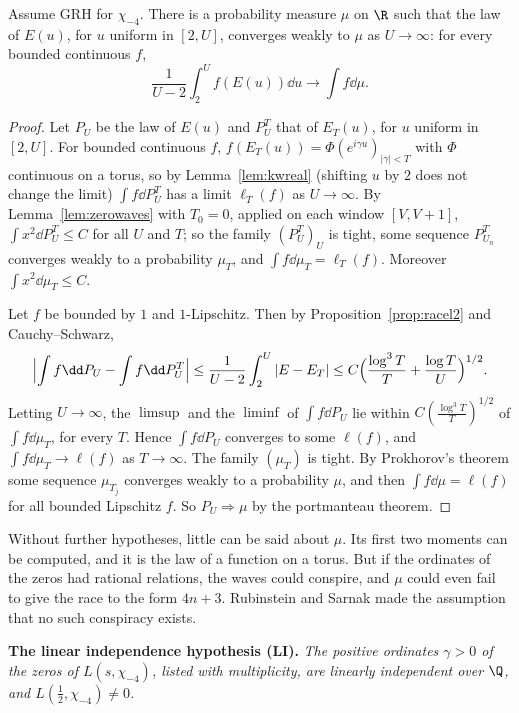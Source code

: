 \begin{theorem}\label{thm:racelimit}
Assume GRH for $\chi_{-4}$. There is a probability measure $\mu$ on $\R$ such that the law of $E(u)$, for $u$ uniform in $[2,U]$, converges weakly to $\mu$ as $U\to\infty$: for every bounded continuous $f$,
\[
\frac1{U-2}\int_2^Uf(E(u))\dd u\longrightarrow\int f\dd\mu.
\]
\end{theorem}
\begin{proof}
Let $P_U$ be the law of $E(u)$ and $P_U^T$ that of $E_T(u)$, for $u$ uniform in $[2,U]$. For bounded continuous $f$, $f(E_T(u))=\Phi(e^{i\gamma u})_{|\gamma|<T}$ with $\Phi$ continuous on a torus, so by Lemma~\ref{lem:kwreal} (shifting $u$ by $2$ does not change the limit) $\int f\dd P_U^T$ has a limit $\ell_T(f)$ as $U\to\infty$. By Lemma~\ref{lem:zerowaves} with $T_0=0$, applied on each window $[V,V+1]$, $\int x^2\dd P_U^T\le C$ for all $U$ and $T$; so the family $(P_U^T)_U$ is tight, some sequence $P_{U_n}^T$ converges weakly to a probability $\mu_T$, and $\int f\dd\mu_T=\ell_T(f)$. Moreover $\int x^2\dd\mu_T\le C$.

Let $f$ be bounded by $1$ and $1$-Lipschitz. Then by Proposition~\ref{prop:racel2} and Cauchy--Schwarz,
\[
\Bigl|\int f\dd P_U-\int f\dd P_U^T\Bigr|\le\frac1{U-2}\int_2^U|E-E_T|\le C\Bigl(\frac{\log^3T}T+\frac{\log T}U\Bigr)^{1/2}.
\]
Letting $U\to\infty$, the $\limsup$ and the $\liminf$ of $\int f\dd P_U$ lie within $C(\frac{\log^3T}T)^{1/2}$ of $\int f\dd\mu_T$, for every $T$. Hence $\int f\dd P_U$ converges to some $\ell(f)$, and $\int f\dd\mu_T\to\ell(f)$ as $T\to\infty$. The family $(\mu_T)$ is tight. By Prokhorov's theorem some sequence $\mu_{T_j}$ converges weakly to a probability $\mu$, and then $\int f\dd\mu=\ell(f)$ for all bounded Lipschitz $f$. So $P_U\Rightarrow\mu$ by the portmanteau theorem.
\end{proof}

Without further hypotheses, little can be said about $\mu$. Its first two moments can be computed, and it is the law of a function on a torus. But if the ordinates of the zeros had rational relations, the waves could conspire, and $\mu$ could even fail to give the race to the form $4n+3$. Rubinstein and Sarnak made the assumption that no such conspiracy exists.

\medskip\noindent\textbf{The linear independence hypothesis (LI).} \emph{The positive ordinates $\gamma>0$ of the zeros of $L(s,\chi_{-4})$, listed with multiplicity, are linearly independent over $\Q$, and $L(\frac12,\chi_{-4})\ne0$.}
\medskip

